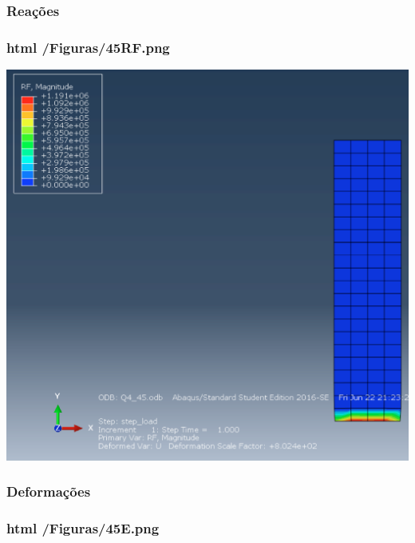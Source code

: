 \subsubsection*{Reações}

\subsubsection*{html /\+Figuras/45\+RF.png}


\begin{DoxyImageNoCaption}
  \mbox{\includegraphics[width=\textwidth,height=\textheight/2,keepaspectratio=true]{45RF.png}}
\end{DoxyImageNoCaption}
 

\subsubsection*{Deformações}

\subsubsection*{html /\+Figuras/45E.png}


